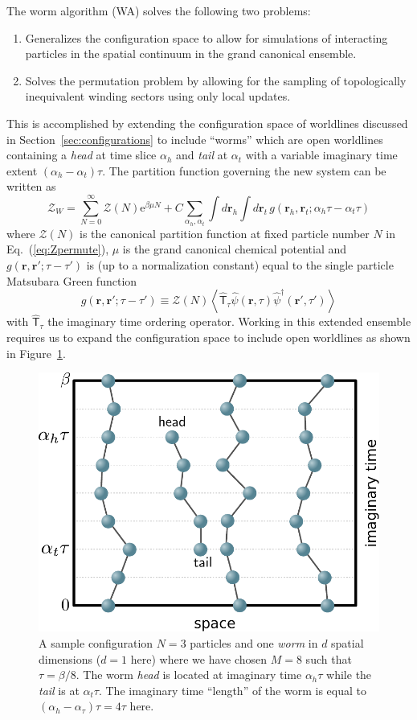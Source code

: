 \documentclass[prb,aps,amssym,nofootinbib,floatfix,notitlepage]{revtex4-1}
\renewcommand{\vec}[1]{\boldsymbol{#1}}
\newcommand{\e}[1]{\mathrm{e}^{#1}}
\renewcommand{\eqref}[1]{Eq.~(\ref{#1})}
\begin{document}
The worm algorithm \cite{Boninsegni:2006ed,Boninsegni:2006gc} (WA) solves the following two problems:
\begin{enumerate}
    \item Generalizes the configuration space to allow for simulations of
        interacting particles in the spatial continuum in the grand canonical
        ensemble.
    \item Solves the permutation problem by allowing for the sampling of
        topologically inequivalent winding sectors using only local updates.
\end{enumerate}
This is accomplished by extending the configuration space of worldlines
discussed in Section~\ref{sec:configurations} to include ``worms'' which are
open worldlines containing a \emph{head} at time slice $\alpha_h $ and \emph{tail} at
$\alpha_t$ with a variable imaginary time extent $(\alpha_h -
\alpha_t)\tau$.  The partition function governing the new system can be written
as
%
\begin{equation}
    \mathcal{Z}_W = \sum_{N=0}^{\infty} \mathcal{Z}(N) \e{\beta \mu N} + C
    \sum_{\alpha_h,\alpha_t} \int d\vec{r}_h \int d\vec{r}_t\,
    g\left(\vec{r}_h,\vec{r}_t; \alpha_h\tau-\alpha_t \tau\right)
\end{equation}
%
where $\mathcal{Z}(N)$ is the canonical partition function at fixed particle number $N$
in \eqref{eq:Zpermute}, $\mu$ is the grand canonical chemical potential and
$g(\vec{r},\vec{r'};\tau-\tau')$ is (up to a normalization constant)
equal to the single particle Matsubara Green function
%
\begin{equation}
    g(\vec{r},\vec{r'};\tau-\tau') \equiv \mathcal{Z}(N)\left \langle 
\hat{\mathsf{T}}_\tau \hat{\psi}(\vec{r},\tau)\hat{\psi}^\dagger(\vec{r}',\tau')
\right \rangle
\end{equation}
%
with $\hat{\mathsf{T}}_\tau$ the imaginary time ordering operator. Working
in this extended ensemble requires us to expand the configuration space to
include open worldlines as shown in Figure~\ref{fig:worm}.  
%
\begin{figure}
\begin{center}
\includegraphics[width=0.40\columnwidth]{Figures/worm.pdf}
\end{center}
\caption{A sample configuration $N=3$ particles and one \emph{worm} in $d$
spatial dimensions ($d=1$ here) where we have chosen $M=8$ such that $\tau
= \beta/8$. The worm \emph{head} is located at imaginary time $\alpha_h \tau$ while
the \emph{tail} is at $\alpha_t \tau$. The imaginary time ``length'' of the worm is
equal to $(\alpha_h-\alpha_\tau)\tau = 4\tau$ here.}
\label{fig:worm}
 \end{figure}
\end{document}
